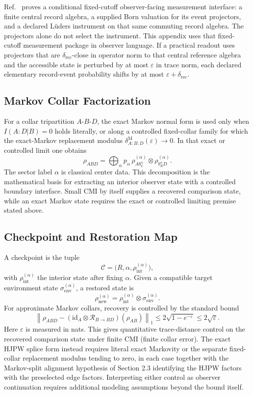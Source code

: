 Ref.~\cite{ophmicrophysics} proves a conditional fixed-cutoff observer-facing
measurement interface: a finite central record algebra, a supplied Born
valuation for its event projectors, and a declared L\"uders instrument on that
same commuting record algebra. The projectors alone do not select the
instrument. This appendix uses that fixed-cutoff
measurement package in observer language. If a practical readout uses projectors that are
\(\delta_{\mathrm{rec}}\)-close in operator norm to that central reference algebra and the
accessible state is perturbed by at most \(\varepsilon\) in trace norm, each declared elementary
record-event probability shifts by at most \(\varepsilon+\delta_{\mathrm{rec}}\).

\subsection{Markov Collar Factorization}

For a collar tripartition \(A\)-\(B\)-\(D\), the exact Markov normal form is used only when
\(I(A:D|B)=0\) holds literally, or along a controlled fixed-collar family for which the
exact-Markov replacement modulus \(\delta^{\mathrm M}_{A:B:D}(\varepsilon)\to0\). In that exact or
controlled limit one obtains
\[
\rho_{ABD}
=\bigoplus_{\alpha} p_{\alpha}\,
\rho^{(\alpha)}_{A b_L^{\alpha}}
\otimes
\rho^{(\alpha)}_{b_R^{\alpha} D}.
\]
The sector label \(\alpha\) is classical center data. This decomposition is the mathematical
basis for extracting an interior observer state with a controlled boundary interface. Small CMI by
itself supplies a recovered comparison state, while an exact Markov state requires the exact or
controlled limiting premise stated above.

\subsection{Checkpoint and Restoration Map}

A checkpoint is the tuple
\[
\mathcal{C}=\bigl(R,\alpha,\rho_{\mathrm{int}}^{(\alpha)}\bigr),
\]
with \(\rho_{\mathrm{int}}^{(\alpha)}\) the interior state after fixing \(\alpha\). Given a compatible target
environment state \(\sigma_{\mathrm{env}}^{(\alpha)}\), a restored state is
\[
\rho_{\mathrm{new}}^{(\alpha)}
=
\rho_{\mathrm{int}}^{(\alpha)}
\otimes
\sigma_{\mathrm{env}}^{(\alpha)}.
\]
For approximate Markov collars, recovery is controlled by the standard bound
\[
\left\|
\rho_{ABD}
-
(\mathrm{id}_A\otimes\mathcal{R}_{B\to BD})(\rho_{AB})
\right\|_1
\le
2\sqrt{1-e^{-\varepsilon}}
\le2\sqrt{\varepsilon}.
\]
Here \(\varepsilon\) is measured in nats. This gives quantitative trace-distance control on the recovered comparison state under finite CMI
(finite collar error). The exact HJPW splice form instead requires literal exact Markovity or the
separate fixed-collar replacement modulus tending to zero, in each case together with the
Markov-split alignment hypothesis of Section 2.3 identifying the HJPW factors with the preselected
edge factors. Interpreting either control as observer
continuation requires additional modeling assumptions beyond the bound itself.

